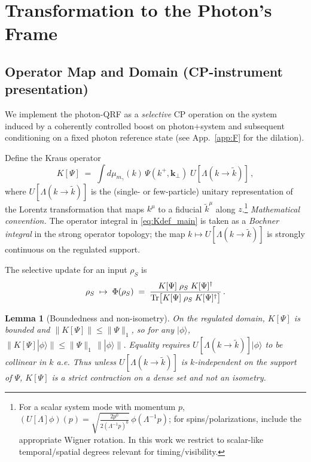 \documentclass[aps,11pt]{article}
\providecommand{\ket}[1]{|#1\rangle}
\newcommand{\kplus}{k^{+}}
\newcommand{\kperp}{\mathbf{k}_{\perp}}
\newtheorem{lem}{Lemma}
\begin{document}
\section{Transformation to the Photon’s Frame}\label{sec:framework}

\subsection{Operator Map and Domain (CP-instrument presentation)}\label{sec:map}
We implement the photon-QRF as a \emph{selective} CP operation on the system induced by a coherently controlled boost on photon+system and subsequent conditioning on a fixed photon reference state (see App.~\ref{app:F} for the dilation).

Define the Kraus operator
\begin{equation}\label{eq:Kdef_main}
K[\Psi]\;=\;\int d\mu_{m_\gamma}(k)\,\Psi(\kplus,\kperp)\; U[\Lambda(k\!\to\!\tilde k)]\,,
\end{equation}
where \(U[\Lambda(k\!\to\!\tilde k)]\) is the (single- or few-particle) unitary representation of the Lorentz transformation that maps \(k^\mu\) to a fiducial \(\tilde k^\mu\) along \(z\).\footnote{For a scalar system mode with momentum \(p\), \((U[\Lambda]\phi)(p)=\sqrt{\frac{2p^0}{2(\Lambda^{-1}p)^0}}\,\phi(\Lambda^{-1}p)\); for spins/polarizations, include the appropriate Wigner rotation. In this work we restrict to scalar-like temporal/spatial degrees relevant for timing/visibility.}
\emph{Mathematical convention.} The operator integral in \eqref{eq:Kdef_main} is taken as a \emph{Bochner integral} in the strong operator topology; the map \(k\mapsto U[\Lambda(k\!\to\!\tilde k)]\) is strongly continuous on the regulated support.

The selective update for an input \(\rho_S\) is
\begin{equation}\label{eq:selective_update}
\rho_S\;\mapsto\;\Phi(\rho_S)\;=\;\frac{K[\Psi]\;\rho_S\;K[\Psi]^\dagger}{\Tr\!\big[K[\Psi]\;\rho_S\;K[\Psi]^\dagger\big]}\,.
\end{equation}

\begin{lem}[Boundedness and non-isometry]\label{lem:bounded}
On the regulated domain, \(K[\Psi]\) is bounded and
\(
\|K[\Psi]\|\le \|\Psi\|_{1}
\),
so for any \(\ket{\phi}\),
\(
\|K[\Psi]\ket{\phi}\|\le \|\Psi\|_{1}\,\|\ket{\phi}\|\).
Equality requires \(U[\Lambda(k\!\to\!\tilde k)]\ket{\phi}\) to be collinear in \(k\) a.e. Thus unless \(U[\Lambda(k\!\to\!\tilde k)]\) is \(k\)-independent on the support of \(\Psi\), \(K[\Psi]\) is a strict contraction on a dense set and not an isometry.
\end{lem}
\end{document}
